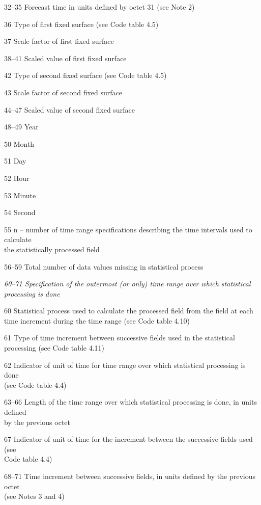 32--35 Forecast time in units defined by octet 31 (see Note 2)

36 Type of first fixed surface (see Code table 4.5)

37 Scale factor of first fixed surface

38--41 Scaled value of first fixed surface

42 Type of second fixed surface (see Code table 4.5)

43 Scale factor of second fixed surface

44--47 Scaled value of second fixed surface

48--49 Year

50 Month

51 Day

52 Hour

53 Minute

54 Second

55 n -- number of time range specifications describing the time intervals used to calculate\\
the statistically processed field

56--59 Total number of data values missing in statistical process

\emph{60--71 Specification of the outermost (or only) time range over which statistical}\\
\emph{processing is done}

60 Statistical process used to calculate the processed field from the field at each\\
time increment during the time range (see Code table 4.10)

61 Type of time increment between successive fields used in the statistical\\
processing (see Code table 4.11)

62 Indicator of unit of time for time range over which statistical processing is done\\
(see Code table 4.4)

63--66 Length of the time range over which statistical processing is done, in units defined\\
by the previous octet

67 Indicator of unit of time for the increment between the successive fields used (see\\
Code table 4.4)

68--71 Time increment between successive fields, in units defined by the previous octet\\
(see Notes 3 and 4)

